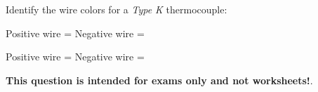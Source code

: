 

Identify the wire colors for a {\it Type K} thermocouple:

\vskip 10pt

Positive wire = \underbar{\hskip 50pt} \hskip 100pt Negative wire = \underbar{\hskip 50pt}







Positive wire =  \hskip 100pt Negative wire = 







{\bf This question is intended for exams only and not worksheets!}.



